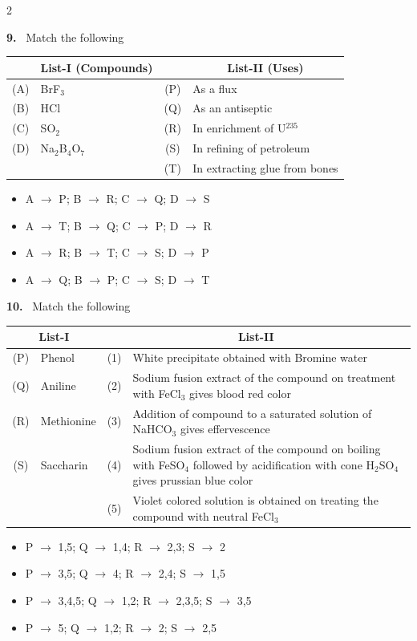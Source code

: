 \documentclass[10pt]{extarticle}
\newcommand{\qn}[1]{\par\smallskip\noindent\textbf{#1.}~}
\newenvironment{qoptions}{\begin{itemize}[leftmargin=1.8em,itemsep=1pt,topsep=2pt,label={}]}{\end{itemize}}
\newcommand{\opt}[2]{\item[(#1)] #2}
\begin{document}
\begin{multicols}{2}
\qn{9} Match the following\par\nobreak
\begin{center}\small\setlength{\tabcolsep}{3pt}
\begin{tabular}{|c|p{2.0cm}|c|p{3.3cm}|}
\hline
 & \multicolumn{1}{c|}{\textbf{List-I} (Compounds)} & & \multicolumn{1}{c|}{\textbf{List-II} (Uses)} \\
\hline
(A) & BrF$_3$ & (P) & As a flux \\
\hline
(B) & HCl & (Q) & As an antiseptic \\
\hline
(C) & SO$_2$ & (R) & In enrichment of U$^{235}$ \\
\hline
(D) & Na$_2$B$_4$O$_7$ & (S) & In refining of petroleum \\
\hline
 & & (T) & In extracting glue from bones \\
\hline
\end{tabular}
\end{center}
\begin{qoptions}
\opt{A}{A $\to$ P; B $\to$ R; C $\to$ Q; D $\to$ S}
\opt{B}{A $\to$ T; B $\to$ Q; C $\to$ P; D $\to$ R}
\opt{C}{A $\to$ R; B $\to$ T; C $\to$ S; D $\to$ P}
\opt{D}{A $\to$ Q; B $\to$ P; C $\to$ S; D $\to$ T}
\end{qoptions}

\qn{10} Match the following\par\nobreak
\begin{center}\small\setlength{\tabcolsep}{3pt}
\begin{tabular}{|c|p{1.9cm}|c|p{4.0cm}|}
\hline
\multicolumn{2}{|c|}{\textbf{List-I}} & \multicolumn{2}{c|}{\textbf{List-II}} \\
\hline
(P) & Phenol & (1) & White precipitate obtained with Bromine water \\
\hline
(Q) & Aniline & (2) & Sodium fusion extract of the compound on treatment with FeCl$_3$ gives blood red color \\
\hline
(R) & Methionine & (3) & Addition of compound to a saturated solution of NaHCO$_3$ gives effervescence \\
\hline
(S) & Saccharin & (4) & Sodium fusion extract of the compound on boiling with FeSO$_4$ followed by acidification with cone H$_2$SO$_4$ gives prussian blue color \\
\hline
 & & (5) & Violet colored solution is obtained on treating the compound with neutral FeCl$_3$ \\
\hline
\end{tabular}
\end{center}
\begin{qoptions}
\opt{A}{P $\to$ 1,5; Q $\to$ 1,4; R $\to$ 2,3; S $\to$ 2}
\opt{B}{P $\to$ 3,5; Q $\to$ 4; R $\to$ 2,4; S $\to$ 1,5}
\opt{C}{P $\to$ 3,4,5; Q $\to$ 1,2; R $\to$ 2,3,5; S $\to$ 3,5}
\opt{D}{P $\to$ 5; Q $\to$ 1,2; R $\to$ 2; S $\to$ 2,5}
\end{qoptions}


\end{multicols}
\end{document}
